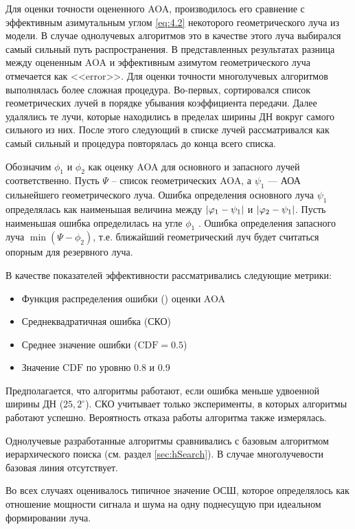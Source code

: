 Для оценки точности оцененного AOA, производилось его сравнение  с эффективным азимутальным углом
\eqref{eq:4.2} некоторого геометрического луча из модели.
В случае однолучевых алгоритмов  это в качестве этого луча выбирался самый сильный
путь распространения. В представленных результатах разница между оцененным AOA и эффективным азимутом
геометрического луча отмечается как <<error>>.
Для оценки точности многолучевых алгоритмов  выполнялась более сложная процедура.
Во-первых, сортировался список геометрических лучей в порядке убывания коэффициента передачи.
Далее удалялись те лучи, которые находились в пределах ширины ДН вокруг самого сильного из них.
После этого следующий в списке лучей рассматривался как самый сильный и процедура повторялась до
конца всего списка.

Обозначим $\phi_1$ и $\phi_2$ как оценку AOA для основного и запасного лучей соответственно.
Пусть $\Psi$ -- список геометрических AOA, а $\psi_1$ —
АОА сильнейшего геометрического луча.
Ошибка определения основного луча $\psi_1$ определялась как наименьшая величина
между $\abs{\varphi_1 - \psi_1}$ и  $\abs{\varphi_2 - \psi_1}$.
Пусть наименьшая ошибка определилась на угле $\phi_1$ .
Ошибка определения запасного луча   $\min(\Psi - \phi_2)$,
т.е. ближайший геометрический луч будет считаться опорным для
резервного луча.

В качестве показателей эффективности рассматривались
следующие метрики:

\newcommand\CDF{}
\begin{itemize}
  \item Функция распределения ошибки (\CDF) оценки AOA
  \item Среднеквадратичная ошибка (СКО)
  \item Среднее значение ошибки ($\CDF = 0.5$)
  \item Значение $\CDF$ по уровню 0.8 и 0.9
\end{itemize}

Предполагается, что алгоритмы работают, если ошибка меньше удвоенной ширины
ДН ($25,2^{\circ}$).  СКО учитывает только эксперименты, в которых
алгоритмы работают успешно.
Вероятность отказа работы алгоритма также измерялась.

Однолучевые  разработанные алгоритмы сравнивались с базовым алгоритмом
иерархического поиска (см.  раздел \ref{sec:hSearch}).  В случае многолучевости
базовая линия отсутствует.

Во всех случаях оценивалось типичное значение ОСШ, которое определялось
как отношение мощности сигнала и шума на одну поднесущую при идеальном
формировании луча.

